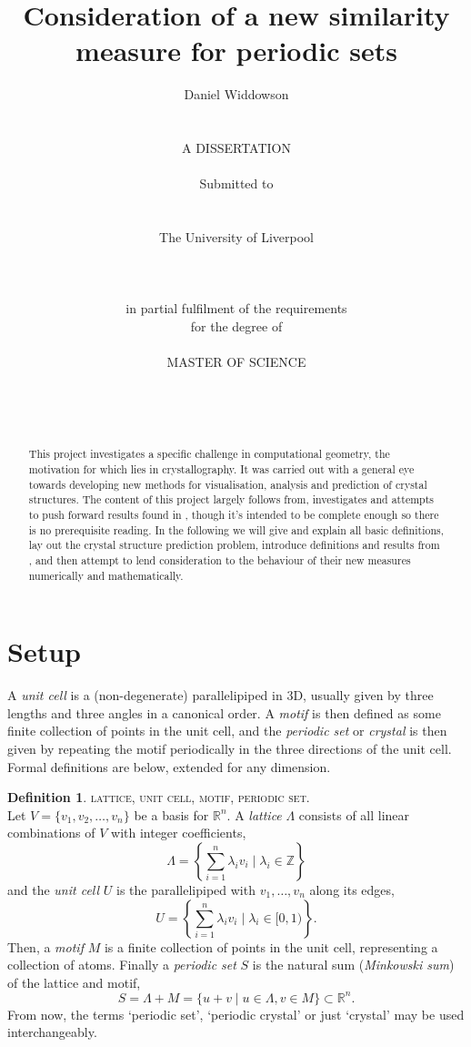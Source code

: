 \documentclass[11pt]{article}
\title{Consideration of a new similarity measure for periodic sets}
\author{Daniel Widdowson
\\    \\    \\
A DISSERTATION
\\    \\
Submitted to 
\\    \\    \\ 
The University of Liverpool
\\    \\
\\    \\
in partial fulfilment of the requirements
\\
for the degree of 
\\     \\
MASTER OF SCIENCE
\\     \\    \\    \\
}
\theoremstyle{definition}
\newtheorem{defi/}{Definition}[section]
\newenvironment{defi}
  {\renewcommand{\qedsymbol}{$\blacktriangleleft$}%
   \pushQED{\qed}\begin{defi/}}
  {\popQED\end{defi/}}
\begin{document}
\maketitle
\thispagestyle{empty}

\newpage

\null

\begin{abstract}
This project investigates a specific challenge in computational geometry, the motivation for which lies in crystallography. It was carried out with a general eye towards developing new methods for visualisation, analysis and prediction of crystal structures. The content of this project largely follows from, investigates and attempts to push forward results found in \cite{2020-Mosca-Kurlin, mosca2020average}, though it's intended to be complete enough so there is no prerequisite reading. In the following we will give and explain all basic definitions, lay out the crystal structure prediction problem, introduce definitions and results from \cite{2020-Mosca-Kurlin}, and then attempt to lend consideration to the behaviour of their new measures numerically and mathematically.
\end{abstract}

\null

\section{Setup}

A \emph{unit cell} is a (non-degenerate) parallelipiped in 3D, usually given by three lengths and three angles in a canonical order. A \emph{motif} is then defined as some finite collection of points in the unit cell, and the \emph{periodic set} or \emph{crystal} is then given by repeating the motif periodically in the three directions of the unit cell. Formal definitions are below, extended for any dimension.

\begin{defi}\textsc{lattice, unit cell, motif, periodic set.}\\
\label{def1}
Let $V = \{v_1,v_2,\dots, v_n\}$ be a basis for $\mathbb{R}^n$. A \emph{lattice} $\Lambda$ consists of all linear combinations of $V$ with integer coefficients,
\[
\Lambda = \left\{\sum_{i=1}^n \lambda_iv_i \mid \lambda_i\in \mathbb{Z} \right\}
\]
and the \emph{unit cell} $U$ is the parallelipiped with $v_1,\dots,v_n$ along its edges,
\[
U = \left\{\sum_{i=1}^n \lambda_iv_i \mid \lambda_i\in [0,1) \right\}.
\]
Then, a \emph{motif} $M$ is a finite collection of points in the unit cell, representing a collection of atoms. Finally a \emph{periodic set} $S$ is the natural sum  (\emph{Minkowski sum}) of the lattice and motif, 
\[
S = \Lambda + M = \{u+v \mid u\in \Lambda, v\in M\} \subset \mathbb{R}^n.
\]
From now, the terms `periodic set', `periodic crystal' or just `crystal' may be used interchangeably.
\end{defi}
\end{document}
